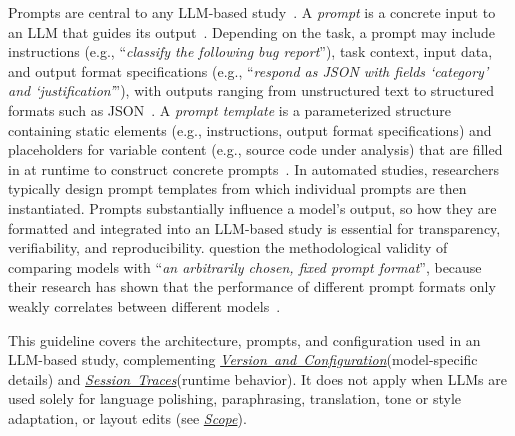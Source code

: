 \documentclass[smallextended]{svjour3}
\newcommand*{\enq}[1]{\enquote{{\itshape#1}}}
\newcommand{\scope}{\hyperref[sec:scope]{\mbox{\emph{Scope}}}\xspace}
\newcommand{\scope}{\href{/scope/}{\emph{Scope}}\xspace}
\newcommand{\modelversion}{\hyperref[sec:report-model-version-configuration-and-customizations]{\mbox{\emph{Version and Configuration}}}\xspace}
\newcommand{\traces}{\hyperref[sec:report-session-traces]{\mbox{\emph{Session Traces}}}\xspace}
\newcommand{\modelversion}{\href{/guidelines/model-version/}{\emph{Version and Configuration}}\xspace}
\newcommand{\traces}{\href{/guidelines/traces/}{\emph{Session Traces}}\xspace}
\begin{document}
Prompts are central to any LLM-based study~\cite{DBLP:conf/iclr/Sclar0TS24}.
A \emph{prompt} is a concrete input to an LLM that guides its output~\cite{DBLP:journals/corr/abs-2406-06608}.
Depending on the task, a prompt may include instructions (e.g., \enq{classify the following bug report}), task context, input data, and output format specifications (e.g., \enq{respond as JSON with fields `category' and `justification'}), with outputs ranging from unstructured text to structured formats such as JSON~\cite{promptingguide_elements}.
A \emph{prompt template} is a parameterized structure containing static elements (e.g., instructions, output format specifications) and placeholders for variable content (e.g., source code under analysis) that are filled in at runtime to construct concrete prompts~\cite{DBLP:journals/corr/abs-2406-06608}.
In automated studies, researchers typically design prompt templates from which individual prompts are then instantiated.
Prompts substantially influence a model's output, so how they are formatted and integrated into an LLM-based study is essential for transparency, verifiability, and reproducibility.
\citeauthor{DBLP:conf/iclr/Sclar0TS24} question the methodological validity of comparing models with \enq{an arbitrarily chosen, fixed prompt format}, because their research has shown that the performance of different prompt formats only weakly correlates between different models~\cite{DBLP:conf/iclr/Sclar0TS24}.

This guideline covers the architecture, prompts, and configuration used in an LLM-based study, complementing \modelversion (model-specific details) and \traces (runtime behavior).
It does not apply when LLMs are used solely for language polishing, paraphrasing, translation, tone or style adaptation, or layout edits (see \scope).
\end{document}
